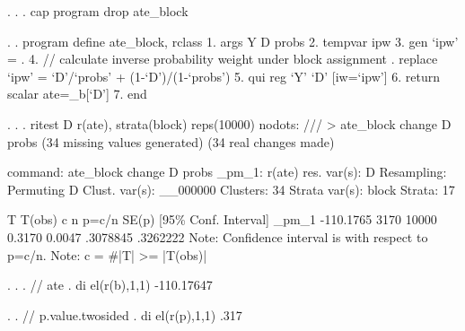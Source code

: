 . 
. 
. cap program drop ate_block

. 
. program define ate_block, rclass
  1. args Y D probs
  2. tempvar ipw
  3. gen `ipw' = .
  4. // calculate inverse probability weight under block assignment
. replace `ipw' = `D'/`probs' + (1-`D')/(1-`probs')
  5. qui reg `Y' `D' [iw=`ipw']
  6. return scalar ate=_b[`D']
  7. end 

. 
. 
. ritest D r(ate), strata(block) reps(10000) nodots: ///
> ate_block change D probs
(34 missing values generated)
(34 real changes made)

      command:  ate_block change D probs
        _pm_1:  r(ate)
  res. var(s):  D
   Resampling:  Permuting D
Clust. var(s):  __000000
     Clusters:  34
Strata var(s):  block
       Strata:  17

T            {\VBAR}     T(obs)       c       n   p=c/n   SE(p) [95\% Conf. Interval]
       _pm_1 {\VBAR}  -110.1765    3170   10000  0.3170  0.0047  .3078845   .3262222
Note: Confidence interval is with respect to p=c/n.
Note: c = \#{\lbr}|T| >= |T(obs)|{\rbr}

. 
. 
. // ate
. di el(r(b),1,1)
-110.17647

. 
. // p.value.twosided
. di el(r(p),1,1)
.317

